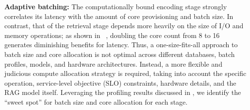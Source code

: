 
\noindent\textbf{Adaptive batching:} 
The computationally bound encoding stage strongly correlates its latency with the amount of core provisioning and batch size. In contrast, that of the retrieval stage depends more heavily on the size of I/O and memory operations; as shown in ~, doubling the core count from 8 to 16 generates diminishing benefits for latency. 
Thus, a one-size-fits-all approach to batch size and core allocation is not optimal across different databases, batch profiles, models, and hardware architectures. Instead, a more flexible and judicious compute allocation strategy is required, taking into account the specific operation, service-level objective (SLO) constraints, hardware details, and the RAG model itself. Leveraging the profiling results discussed in , we identify the “sweet spot” for batch size and core allocation for each stage.

